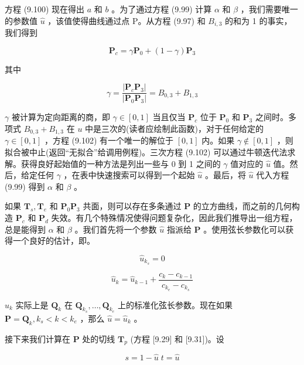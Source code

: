 \documentclass[../main.tex]{subfiles}
\begin{document}
方程 (9.100) 现在得出 \(a\) 和 \(b\) 。为了通过方程 (9.99) 计算 \(\alpha\) 和 \(\beta\) ，我们需要唯一的参数值 \(\widehat{u}\) ，该值使得曲线通过点 P。从方程 (9.97) 和 \({B}_{i,3}\) 的和为 1 的事实，我们得到

\[
{\mathbf{P}}_{c} = \gamma {\mathbf{P}}_{0} + \left( {1 - \gamma }\right) {\mathbf{P}}_{3} \tag{9.101}
\]

其中

\[
\gamma  = \frac{\left| {\mathbf{P}}_{c}{\mathbf{P}}_{3}\right| }{\left| {\mathbf{P}}_{0}{\mathbf{P}}_{3}\right| } = {B}_{0,3} + {B}_{1,3} \tag{9.102}
\]

\(\gamma\) 被计算为定向距离的商，即 \(\gamma  \in  \left\lbrack  {0,1}\right\rbrack\) 当且仅当 \({\mathbf{P}}_{c}\) 位于 \({\mathbf{P}}_{0}\) 和 \({\mathbf{P}}_{3}\) 之间时。多项式 \({B}_{0,3} + {B}_{1,3}\) 在 \(u\) 中是三次的(读者应绘制此函数)，对于任何给定的 \(\gamma  \in  \left\lbrack  {0,1}\right\rbrack\) ，方程 (9.102) 有一个唯一的解位于 \(\left\lbrack  {0,1}\right\rbrack\) 内。如果 \(\gamma  \notin  \left\lbrack  {0,1}\right\rbrack\) ，则拟合被中止(返回“无拟合”给调用例程)。三次方程 (9.102) 可以通过牛顿迭代法求解。获得良好起始值的一种方法是列出一些与 0 到 1 之间的 \(\gamma\) 值对应的 \(\widehat{u}\) 值。然后，给定任何 \(\gamma\) ，在表中快速搜索可以得到一个起始 \(\widehat{u}\) 。最后，将 \(\widehat{u}\) 代入方程 (9.99) 得到 \(\alpha\) 和 \(\beta\) 。

如果 \({\mathbf{T}}_{s},{\mathbf{T}}_{e}\) 和 \({\mathbf{P}}_{0}{\mathbf{P}}_{3}\) 共面，则可以存在多条通过 \(\mathbf{P}\) 的立方曲线，而之前的几何构造 \({\mathbf{P}}_{c}\) 和 \({\mathbf{P}}_{d}\) 失效。有几个特殊情况使得问题复杂化，因此我们推导出一组方程，总是能得到 \(\alpha\) 和 \(\beta\) 。我们首先将一个参数 \(\widehat{u}\) 指派给 \(\mathbf{P}\) 。使用弦长参数化可以获得一个良好的估计，即。

\[
{\widehat{u}}_{{k}_{s}} = 0
\]

\[
{\widehat{u}}_{k} = {\widehat{u}}_{k - 1} + \frac{{c}_{k} - {c}_{k - 1}}{{c}_{{k}_{e}} - {c}_{{k}_{s}}} \tag{9.103}
\]

\({\widehat{u}}_{k}\) 实际上是 \({\mathbf{Q}}_{k}\) 在 \({\mathbf{Q}}_{{k}_{s}},\ldots ,{\mathbf{Q}}_{{k}_{e}}\) 上的标准化弦长参数。现在如果 \(\mathbf{P} = {\mathbf{Q}}_{k},{k}_{s} < k < {k}_{e}\) ，那么 \(\widehat{u} = {\widehat{u}}_{k}\) 。

接下来我们计算在 \(\mathbf{P}\) 处的切线 \({\mathbf{T}}_{p}\) (方程 [9.29] 和 [9.31])。设

\[
s = 1 - \widehat{u}\;t = \widehat{u}
\]
\end{document}
